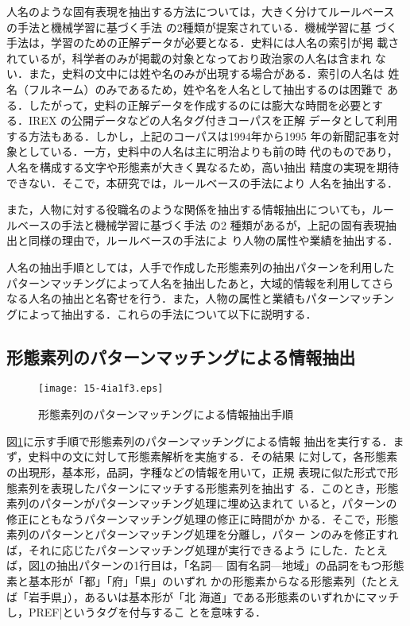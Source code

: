 \documentclass[japanese]{jnlp_1.4}
\def\|{}
\begin{document}
人名のような固有表現を抽出する方法については，大きく分けてルールベース
の手法\cite{rau1991}と機械学習に基づく手法
\cite{asahara2003,maccallum2003}の2種類が提案されている．機械学習に基
づく手法は，学習のための正解データが必要となる．史料には人名の索引が掲
載されているが，科学者のみが掲載の対象となっており政治家の人名は含まれ
ない．また，史料の文中には姓や名のみが出現する場合がある．索引の人名は
姓名（フルネーム）のみであるため，姓や名を人名として抽出するのは困難で
ある．したがって，史料の正解データを作成するのには膨大な時間を必要とす
る．IREX\cite{sekine2000} の公開データなどの人名タグ付きコーパスを正解
データとして利用する方法もある．しかし，上記のコーパスは1994年から1995 
年の新聞記事を対象としている．一方，史料中の人名は主に明治よりも前の時
代のものであり，人名を構成する文字や形態素が大きく異なるため，高い抽出
精度の実現を期待できない．そこで，本研究では，ルールベースの手法により
人名を抽出する．

また，人物に対する役職名のような関係を抽出する情報抽出についても，ルー
ルベースの手法と機械学習に基づく手法\cite{sudo2003,greenwood2005} の2 
種類があるが，上記の固有表現抽出と同様の理由で，ルールベースの手法によ
り人物の属性や業績を抽出する．

人名の抽出手順としては，人手で作成した形態素列の抽出パターンを利用した
パターンマッチングによって人名を抽出したあと，大域的情報を利用してさら
なる人名の抽出と名寄せを行う．また，人物の属性と業績もパターンマッチン
グによって抽出する．これらの手法について以下に説明する．


\subsection{形態素列のパターンマッチングによる情報抽出}

\begin{figure}[b]
\begin{center}
\texttt{[image: 15-4ia1f3.eps]}
\caption{形態素列のパターンマッチングによる情報抽出手順}
\label{fig:matching}
\end{center}
\end{figure}

図\ref{fig:matching}に示す手順で形態素列のパターンマッチングによる情報
抽出を実行する．まず，史料中の文に対して形態素解析を実施する．その結果
に対して，各形態素の出現形，基本形，品詞，字種などの情報を用いて，正規
表現に似た形式で形態素列を表現したパターンにマッチする形態素列を抽出す
る．このとき，形態素列のパターンがパターンマッチング処理に埋め込まれて
いると，パターンの修正にともなうパターンマッチング処理の修正に時間がか
かる．そこで，形態素列のパターンとパターンマッチング処理を分離し，パター
ンのみを修正すれば，それに応じたパターンマッチング処理が実行できるよう
にした．たとえば，図\ref{fig:matching}の抽出パターンの1行目は，「名詞— 
固有名詞—地域」の品詞をもつ形態素と基本形が「都」「府」「県」のいずれ
かの形態素からなる形態素列（たとえば「岩手県」），あるいは基本形が「北
海道」である形態素のいずれかにマッチし，\|PREF|というタグを付与するこ
とを意味する．
\end{document}

